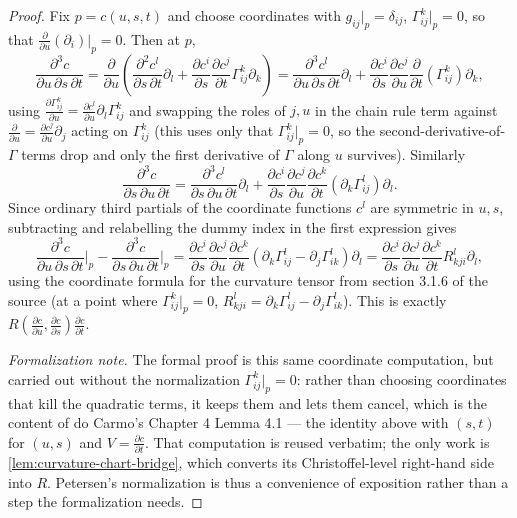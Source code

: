 \begin{proof}
  Fix $p=c(u,s,t)$ and choose coordinates with $g_{ij}|_p=\delta_{ij}$,
  $\Gamma^k_{ij}|_p=0$, so that $\frac{\partial}{\partial u}(\partial_i)|_p=0$.
  Then at $p$,
  \[
    \frac{\partial^3c}{\partial u\,\partial s\,\partial t}
    =\frac{\partial}{\partial u}\!\left(\frac{\partial^2c^l}{\partial s\,\partial t}\partial_l
    +\frac{\partial c^i}{\partial s}\frac{\partial c^j}{\partial t}\Gamma^k_{ij}\partial_k\right)
    =\frac{\partial^3c^l}{\partial u\,\partial s\,\partial t}\partial_l
    +\frac{\partial c^i}{\partial s}\frac{\partial c^j}{\partial u}
    \frac{\partial}{\partial t}(\Gamma^k_{ij})\partial_k,
  \]
  using $\frac{\partial\Gamma^k_{ij}}{\partial u}
  =\frac{\partial c^l}{\partial u}\partial_l\Gamma^k_{ij}$ and swapping the roles of
  $j,u$ in the chain rule term against $\frac{\partial}{\partial u}=\frac{\partial
  c^j}{\partial u}\partial_j$ acting on $\Gamma^k_{ij}$ (this uses only that
  $\Gamma^k_{ij}|_p=0$, so the second-derivative-of-$\Gamma$ terms drop and only
  the first derivative of $\Gamma$ along $u$ survives). Similarly
  \[
    \frac{\partial^3c}{\partial s\,\partial u\,\partial t}
    =\frac{\partial^3c^l}{\partial s\,\partial u\,\partial t}\partial_l
    +\frac{\partial c^i}{\partial s}\frac{\partial c^j}{\partial u}
    \frac{\partial c^k}{\partial t}(\partial_k\Gamma^l_{ij})\partial_l.
  \]
  Since ordinary third partials of the coordinate functions $c^l$ are symmetric
  in $u,s$, subtracting and relabelling the dummy index in the first expression
  gives
  \[
    \frac{\partial^3c}{\partial u\,\partial s\,\partial t}\bigg|_p
    -\frac{\partial^3c}{\partial s\,\partial u\,\partial t}\bigg|_p
    =\frac{\partial c^i}{\partial s}\frac{\partial c^j}{\partial u}
    \frac{\partial c^k}{\partial t}(\partial_k\Gamma^l_{ij}-\partial_j\Gamma^l_{ik})\partial_l
    =\frac{\partial c^i}{\partial s}\frac{\partial c^j}{\partial u}
    \frac{\partial c^k}{\partial t}R^l_{kji}\partial_l,
  \]
  using the coordinate formula for the curvature tensor from section 3.1.6 of the
  source (at a point where $\Gamma^k_{ij}|_p=0$, $R^l_{kji}=\partial_k\Gamma^l_{ij}
  -\partial_j\Gamma^l_{ik}$). This is exactly
  $R\!\left(\frac{\partial c}{\partial u},\frac{\partial c}{\partial s}\right)
  \frac{\partial c}{\partial t}$.

  \emph{Formalization note.} The formal proof is this same coordinate computation,
  but carried out without the normalization $\Gamma^k_{ij}|_p=0$: rather than
  choosing coordinates that kill the quadratic terms, it keeps them and lets them
  cancel, which is the content of do Carmo's Chapter 4 Lemma 4.1 — the identity
  above with $(s,t)$ for $(u,s)$ and $V=\frac{\partial c}{\partial t}$. That
  computation is reused verbatim; the only work is
  \cref{lem:curvature-chart-bridge}, which converts its Christoffel-level
  right-hand side into $R$. Petersen's normalization is thus a convenience of
  exposition rather than a step the formalization needs.
  \leanok
\end{proof}


